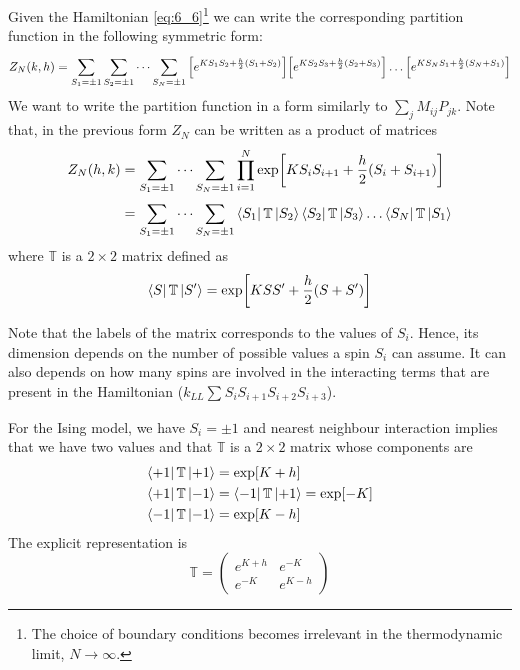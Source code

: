 \documentclass[../../Main/Main.tex]{subfiles}
\begin{document}
Given the Hamiltonian \eqref{eq:6_6}\footnote{The choice of boundary conditions becomes irrelevant in the thermodynamic limit, \( N \rightarrow \infty  \).} we can write the corresponding partition function in the following symmetric form:
\begin{equation*}
  Z_N (k,h) = \sum_{S_1 = \pm 1}^{} \sum_{S_2 = \pm 1}^{}  \dots \sum_{S_N = \pm 1}^{}
  \qty[e^{K S_1 S_2 + \frac{h}{2}(S_1+S_2)} ] \qty[e^{K S_2 S_3 + \frac{h}{2}(S_2+S_3)} ] \dots \qty[e^{K S_N S_1 + \frac{h}{2}(S_N+S_1)} ]
\end{equation*}
We want to write the partition function in a form similarly to \( \sum_{j}^{}  M_{ij} P_{jk} \).
Note that, in the previous form \( Z_N \) can be written as a product of matrices
\begin{equation}
\begin{split}
Z_N (h,k)  &= \sum_{S_1 = \pm 1}^{} \dots \sum_{S_N = \pm 1}^{} \prod_{i=1}^{N} \exp [K S_i S_{i+1} + \frac{h}{2} (S_i + S_{i+1})] \\
& =  \sum_{S_1 = \pm 1}^{} \dots \sum_{S_N = \pm 1}^{} \bra{S_1} \mathbb{T} \ket{S_2} \bra{S_2}  \mathbb{T} \ket{S_3} \dots \bra{S_N}  \mathbb{T} \ket{S_1}
\end{split}
\end{equation}
where \( \mathbb{T} \) is a \( 2 \times 2 \)  matrix defined as
\begin{equation}
  \bra{S} \mathbb{T} \ket{S'} = \exp [K S S' + \frac{h}{2} (S+S')]
\end{equation}
\begin{remark}
  Note that the labels of the matrix corresponds to the values of \( S_i \). Hence, its dimension depends on the number of possible values a spin \( S_i \) can assume.
  It can also depends on how many spins are involved in the interacting terms that are present in the Hamiltonian (\( k_{LL} \sum_{}^{} S_i S_{i+1} S_{i+2} S_{i+3}  \)).
\end{remark}
 For the Ising model, we have \( S_i = \pm 1 \) and nearest neighbour interaction implies that we have two values and that \( \mathbb{T} \) is a \( 2 \times 2 \) matrix whose components are
\begin{subequations}
\begin{align}
  \bra{+1} \mathbb{T} \ket{+1} &= \exp [K+h]  \\
    \bra{+1} \mathbb{T} \ket{-1} &=   \bra{-1} \mathbb{T} \ket{+1} = \exp [-K] \\
      \bra{-1} \mathbb{T} \ket{-1} &=\exp [K-h] 
\end{align}
\end{subequations}
The explicit representation is
\begin{equation}
  \mathbb{T} =
\begin{pmatrix}
e^{K+h}    & e^{-K}  \\
  e^{-K}  & e^{K-h}
\end{pmatrix}
\end{equation}
\end{document}
